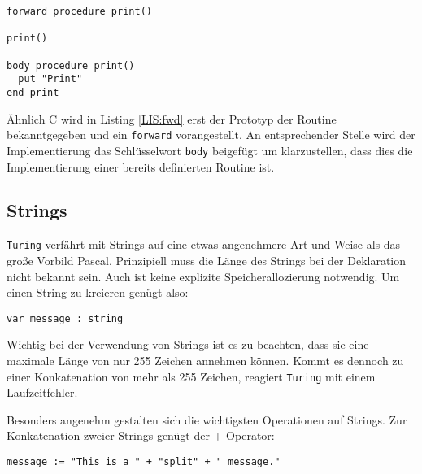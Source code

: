 \lstset{label=LIS:fwd}
\begin{table}[h!]
\begin{lstlisting}
forward procedure print()

print()

body procedure print()
  put "Print"
end print
\end{lstlisting}
\end{table}

\"Ahnlich C wird in Listing \ref{LIS:fwd} erst der Prototyp der Routine bekanntgegeben und ein \lstinline{forward} vorangestellt. An entsprechender Stelle wird der Implementierung das Schl\"usselwort \lstinline{body} beigef\"ugt um klarzustellen, dass dies die Implementierung einer bereits definierten Routine ist.

\subsection{Strings}

\texttt{Turing} verf\"ahrt mit Strings auf eine etwas angenehmere Art und Weise als das gro\ss{}e Vorbild Pascal. Prinzipiell muss die L\"ange des Strings bei der Deklaration nicht bekannt sein. Auch ist keine explizite Speicherallozierung notwendig. Um einen String zu kreieren gen\"ugt also:

\lstset{label=LIS:str:decl}
\begin{table}[h!]
\begin{lstlisting}
var message : string
\end{lstlisting}
\end{table}

Wichtig bei der Verwendung von Strings ist es zu beachten, dass sie eine maximale L\"ange von nur 255 Zeichen annehmen k\"onnen. Kommt es dennoch zu einer Konkatenation von mehr als 255 Zeichen, reagiert \texttt{Turing} mit einem Laufzeitfehler.

Besonders angenehm gestalten sich die wichtigsten Operationen auf Strings. Zur Konkatenation zweier Strings gen\"ugt der $+$-Operator:

\lstset{label=LIS:str:conc}
\begin{table}[h!]
\begin{lstlisting}
message := "This is a " + "split" + " message."
\end{lstlisting}
\end{table}

